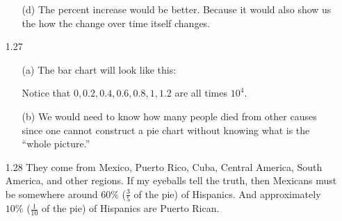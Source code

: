 \documentclass[11pt, a4paper]{article}
\begin{document}
\begin{itemize}
\begin{itemize}
\item[(d)]
The percent increase would be better. Because it would also show us the how the change over time itself changes.
\end{itemize}

\item[]
\item[]

\item[1.27]
\begin{itemize}
\item[(a)]
The bar chart will look like this:

\begin{center}
\end{center}

Notice that $0, 0.2, 0.4, 0.6, 0.8, 1, 1.2$ are all times $10^4$.

\item[]

\item[(b)]
We would need to know how many people died from other causes since one cannot
construct a pie chart without knowing what is the ``whole picture.''
\end{itemize}

\item[]
\item[]

\item[1.28]
They come from Mexico, Puerto Rico, Cuba, Central America, South America, and other regions.
If my eyeballs tell the truth, then Mexicans must be somewhere around $60\%$ ($\frac{3}{5}$ of the pie) of Hispanics.
And approximately $10\%$ ($\frac{1}{10}$ of the pie) of Hispanics are Puerto Rican.

\item[]
\item[]


\end{itemize}
\end{document}

